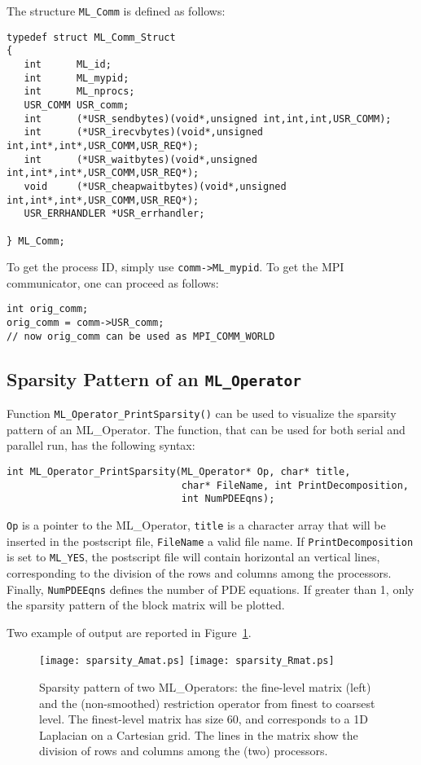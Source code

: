 \documentclass[10pt,letter,relax]{SANDreport}
\begin{document}
The structure \verb!ML_Comm! is defined as follows:
\begin{verbatim}
typedef struct ML_Comm_Struct
{
   int      ML_id;
   int      ML_mypid;
   int      ML_nprocs;
   USR_COMM USR_comm;
   int      (*USR_sendbytes)(void*,unsigned int,int,int,USR_COMM);
   int      (*USR_irecvbytes)(void*,unsigned int,int*,int*,USR_COMM,USR_REQ*);
   int      (*USR_waitbytes)(void*,unsigned int,int*,int*,USR_COMM,USR_REQ*);
   void     (*USR_cheapwaitbytes)(void*,unsigned int,int*,int*,USR_COMM,USR_REQ*);
   USR_ERRHANDLER *USR_errhandler;

} ML_Comm;
\end{verbatim}
To get the process ID, simply use \verb!comm->ML_mypid!. To get the MPI
communicator, one can proceed as follows:
\begin{verbatim}
int orig_comm;
orig_comm = comm->USR_comm;
// now orig_comm can be used as MPI_COMM_WORLD
\end{verbatim}


\subsection{Sparsity Pattern of an {\tt ML\_Operator}}
\label{sec:sparsity}

Function \verb!ML_Operator_PrintSparsity()! can be used to visualize the 
sparsity pattern of an ML\_Operator. The function, that can be used for
both serial and parallel run, has the following syntax:
\begin{verbatim}
int ML_Operator_PrintSparsity(ML_Operator* Op, char* title,
                              char* FileName, int PrintDecomposition,
                              int NumPDEEqns);
\end{verbatim}
\verb!Op! is a pointer to the ML\_Operator, \verb!title! is a character array
that will be inserted in the postscript file, \verb!FileName! a valid file
name. If \verb!PrintDecomposition! is set to \verb!ML_YES!, the postscript
file will contain horizontal an vertical lines, corresponding to the division
of the rows and columns among the processors. Finally, \verb!NumPDEEqns!
defines the number of PDE equations. If greater than 1, only the sparsity
pattern of the block matrix will be plotted.

Two example of output are reported in Figure~\ref{fig:sparsity-pattern}.

\begin{figure}[ht]
\centering
\texttt{[image: sparsity\_Amat.ps]} \hspace{0.5cm}
\texttt{[image: sparsity\_Rmat.ps]}
\caption{Sparsity pattern of two ML\_Operators: the fine-level matrix (left)
  and the (non-smoothed) restriction operator from finest to coarsest level.
  The finest-level matrix has size 60, and
  corresponds to a 1D Laplacian on a Cartesian grid. 
  The lines in the matrix show the division of rows and columns among the (two) processors.}
\label{fig:sparsity-pattern}
\end{figure}
\end{document}
